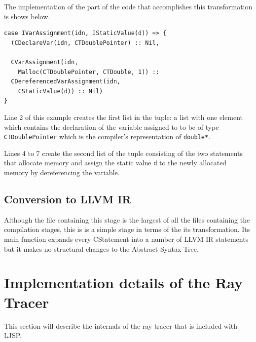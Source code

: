 \documentclass[11pt]{report}
\begin{document}
The implementation of the part of the code that accomplishes this transformation is shows below.

\begin{lstlisting}
case IVarAssignment(idn, IStaticValue(d)) => {
  (CDeclareVar(idn, CTDoublePointer) :: Nil,
  
  CVarAssignment(idn, 
    Malloc(CTDoublePointer, CTDouble, 1)) ::
  CDereferencedVarAssignment(idn, 
    CStaticValue(d)) :: Nil)
}
\end{lstlisting}

Line 2 of this example creates the first list in the tuple: a list with one element which contains the declaration of the variable assigned to to be of type \texttt{CTDoublePointer} which is the compiler's representation of \texttt{double*}.

Lines 4 to 7 create the second list of the tuple consisting of the two statements that allocate memory and assign the static value \texttt{d} to the newly allocated memory by dereferencing the variable.



\subsection{Conversion to LLVM IR}

Although the file containing this stage is the largest of all the files containing the compilation stages, this is is a simple stage in terms of the its transformation. Its main function expands every CStatement into a number of LLVM IR statements but it makes no structural changes to the Abstract Syntax Tree.





\section{Implementation details of the Ray Tracer}
This section will describe the internals of the ray tracer that is included with LJSP.
\end{document}
